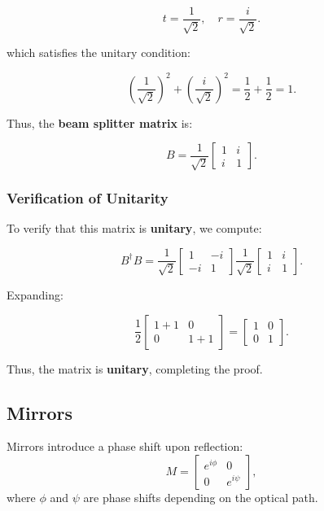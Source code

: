 \documentclass[a4paper,12pt]{article}
\begin{document}
\begin{equation}
    t = \frac{1}{\sqrt{2}}, \quad r = \frac{i}{\sqrt{2}}.
\end{equation}

which satisfies the unitary condition:

\begin{equation}
\left( \frac{1}{\sqrt{2}} \right)^2 + \left( \frac{i}{\sqrt{2}} \right)^2 = \frac{1}{2} + \frac{1}{2} = 1.
\end{equation}

Thus, the \textbf{beam splitter matrix} is:

\begin{equation}
B =
\frac{1}{\sqrt{2}}
\begin{bmatrix}
    1 & i \\
    i & 1
\end{bmatrix}.
\end{equation}

\subsubsection{\textbf{Verification of Unitarity}}
To verify that this matrix is \textbf{unitary}, we compute:

\begin{equation}
    B^\dagger B =
    \frac{1}{\sqrt{2}}
    \begin{bmatrix}
        1 & -i \\
        -i & 1
    \end{bmatrix}
    \frac{1}{\sqrt{2}}
    \begin{bmatrix}
        1 & i \\
        i & 1
    \end{bmatrix}.
\end{equation}

Expanding:

\begin{equation}
\frac{1}{2}
\begin{bmatrix}
    1 + 1 & 0 \\
    0 & 1 + 1
\end{bmatrix}
=
\begin{bmatrix}
    1 & 0 \\
    0 & 1
\end{bmatrix}.
\end{equation}

Thus, the matrix is \textbf{unitary}, completing the proof.


\subsection{Mirrors}
Mirrors introduce a phase shift upon reflection:
\begin{equation}
M = \begin{bmatrix} e^{i\phi} & 0 \\ 0 & e^{i\psi} \end{bmatrix},
\end{equation}
where \( \phi \) and \( \psi \) are phase shifts depending on the optical path.
\end{document}
